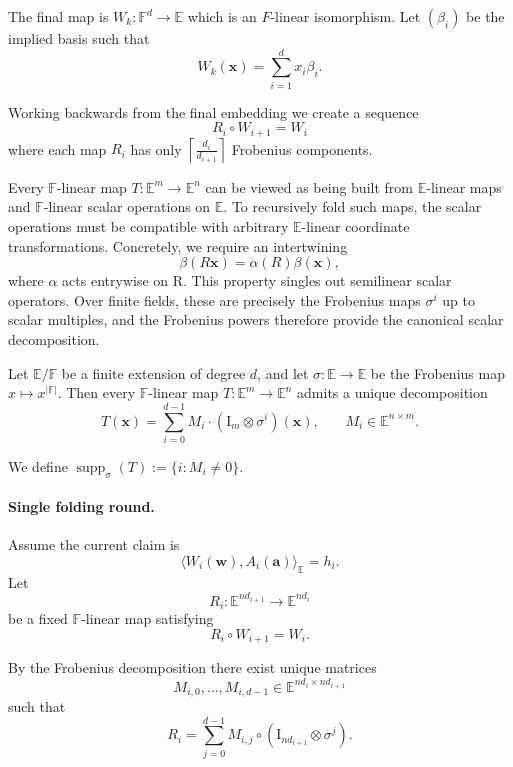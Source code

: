 \documentclass[11pt,letterpaper,usenames,dvipsnames]{article}
\begin{document}
The final map is $W_k : \mathbb{F}^d \to \mathbb{E}$ which is an $F$-linear isomorphism. Let $(\beta_i)$ be the implied basis such that 
\[
W_k(\mathbf x) = \sum_{i=1}^d x_i \beta_i \text{.}
\]

Working backwards from the final embedding we create a sequence
\[
R_i \circ W_{i+1} = W_i
\]
where each map $R_i$ has only $\left\lceil \frac{d_i}{d_{i+1}}\right\rceil$ Frobenius components.

\pagebreak
Every $\mathbb F$-linear map $T:\mathbb E^m\to\mathbb E^n$ can be viewed as being built from $\mathbb E$-linear maps and $\mathbb F$-linear scalar operations on $\mathbb E$. To recursively fold such maps, the scalar operations must be compatible with arbitrary $\mathbb E$-linear coordinate transformations. Concretely, we require an intertwining
\[
\beta(R\mathbf x)=\alpha(R)\beta(\mathbf x),
\]
where $\alpha$ acts entrywise on R. This property singles out semilinear scalar operators. Over finite fields, these are precisely the Frobenius maps $\sigma^i$ up to scalar multiples, and the Frobenius powers therefore provide the canonical scalar decomposition.


\begin{theorem}
Let $\mathbb E/\mathbb F$ be a finite extension of degree $d$, and let $\sigma: \mathbb{E} \to \mathbb{E}$ be the Frobenius map $x \mapsto x^{|\mathbb{F}|}$. Then every $\mathbb F$-linear map $T: \mathbb{E}^m \to \mathbb{E}^n$ admits a unique decomposition
\[
T(\mathbf{x}) = \sum_{i=0}^{d-1} M_i \cdot (\mathrm{I}_m \otimes \sigma^i)(\mathbf{x})
\text{,} \qquad M_i \in \mathbb{E}^{n \times m} \text{.}
\]
\end{theorem}
We define $\operatorname{supp}_\sigma(T) := \{i : M_i \neq 0\}$.

\paragraph{Single folding round.}
Assume the current claim is
\[
\langle W_i(\mathbf w),A_i(\mathbf a)\rangle_{\mathbb E}=h_i.
\]
Let
\[
R_i:\mathbb E^{nd_{i+1}}\to\mathbb E^{nd_i}
\]
be a fixed $\mathbb F$-linear map satisfying
\[
R_i\circ W_{i+1}=W_i.
\]

By the Frobenius decomposition there exist unique matrices
\[
M_{i,0},\ldots,M_{i,d-1}
\in
\mathbb E^{nd_i\times nd_{i+1}}
\]
such that
\[
R_i
=
\sum_{j=0}^{d-1}
M_{i,j}\circ
(\mathrm I_{nd_{i+1}}\otimes\sigma^j).
\]
\end{document}
